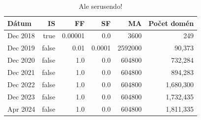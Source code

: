 \begin{table}[!htb]
\centering
{}
\caption{Ale serusendo!}
\end{table}

\pagebreak

\begin{table}[!htb]
\centering
\begin{tabular}{l||r|r|r|r|r}
\toprule
Dátum & IS & FF & SF & MA & Počet domén \\
\midrule
\midrule
Dec 2018 & true & 0.00001 & 0.0 & 3600 & 249 \\
Dec 2019 & false & 0.01 & 0.0001 & 2592000 & 90,373 \\
Dec 2020 & false & 1.0 & 0.0 & 604800 & 732,284 \\
Dec 2021 & false & 1.0 & 0.0 & 604800 & 894,283 \\
Dec 2022 & false & 1.0 & 0.0 & 604800 & 1,680,300 \\
Dec 2023 & false & 1.0 & 0.0 & 604800 & 1,732,435 \\
Apr 2024 & false & 1.0 & 0.0 & 604800 & 1,811,335 \\
\bottomrule
\end{tabular}
\caption{Ale serusendo!}
\end{table}

\pagebreak

